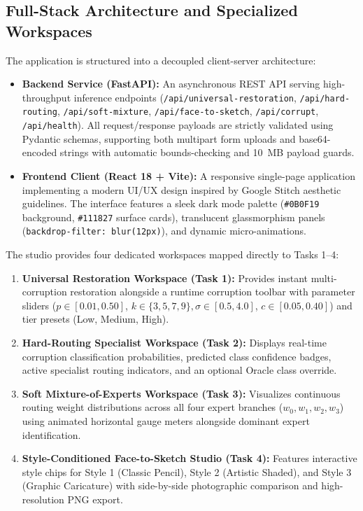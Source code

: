 \documentclass[conference]{IEEEtran}
\begin{document}
\subsection{Full-Stack Architecture and Specialized Workspaces}
The application is structured into a decoupled client-server architecture:
\begin{itemize}
    \item \textbf{Backend Service (FastAPI):} An asynchronous REST API serving high-throughput inference endpoints (\texttt{/api/universal-restoration}, \texttt{/api/hard-routing}, \texttt{/api/soft-mixture}, \texttt{/api/face-to-sketch}, \texttt{/api/corrupt}, \texttt{/api/health}). All request/response payloads are strictly validated using Pydantic schemas, supporting both multipart form uploads and base64-encoded strings with automatic bounds-checking and 10~MB payload guards.
    \item \textbf{Frontend Client (React 18 + Vite):} A responsive single-page application implementing a modern UI/UX design inspired by Google Stitch aesthetic guidelines. The interface features a sleek dark mode palette (\texttt{\#0B0F19} background, \texttt{\#111827} surface cards), translucent glassmorphism panels (\texttt{backdrop-filter: blur(12px)}), and dynamic micro-animations.
\end{itemize}

The studio provides four dedicated workspaces mapped directly to Tasks 1--4:
\begin{enumerate}
    \item \textbf{Universal Restoration Workspace (Task 1):} Provides instant multi-corruption restoration alongside a runtime corruption toolbar with parameter sliders ($p \in [0.01, 0.50]$, $k \in \{3, 5, 7, 9\}, \sigma \in [0.5, 4.0]$, $c \in [0.05, 0.40]$) and tier presets (Low, Medium, High).
    \item \textbf{Hard-Routing Specialist Workspace (Task 2):} Displays real-time corruption classification probabilities, predicted class confidence badges, active specialist routing indicators, and an optional Oracle class override.
    \item \textbf{Soft Mixture-of-Experts Workspace (Task 3):} Visualizes continuous routing weight distributions across all four expert branches ($w_0, w_1, w_2, w_3$) using animated horizontal gauge meters alongside dominant expert identification.
    \item \textbf{Style-Conditioned Face-to-Sketch Studio (Task 4):} Features interactive style chips for Style 1 (Classic Pencil), Style 2 (Artistic Shaded), and Style 3 (Graphic Caricature) with side-by-side photographic comparison and high-resolution PNG export.
\end{enumerate}
\end{document}
